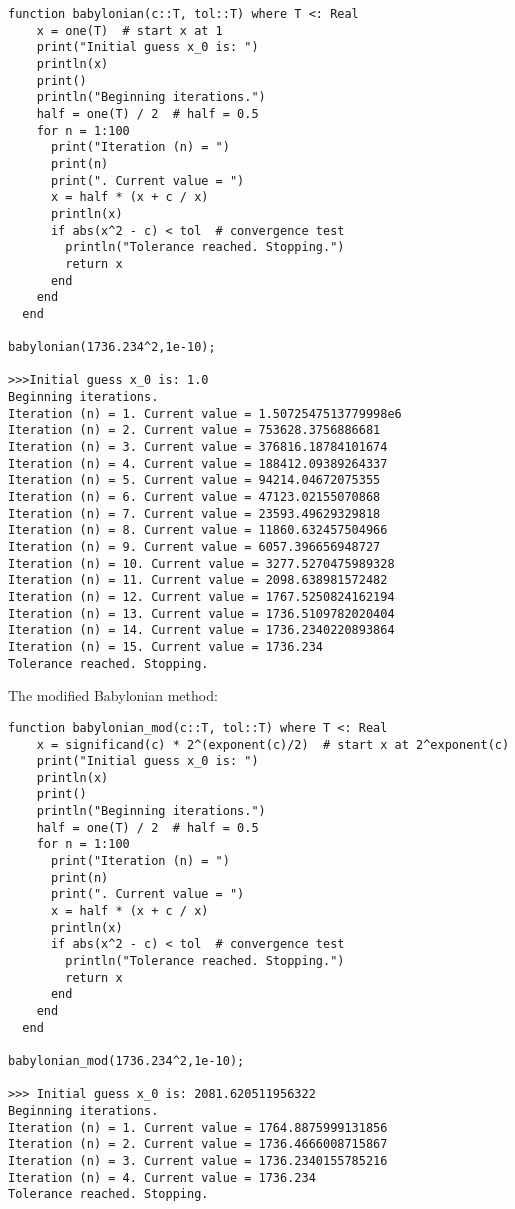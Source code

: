 \documentclass{article}
\begin{document}
\begin{verbatim}
function babylonian(c::T, tol::T) where T <: Real
    x = one(T)  # start x at 1
    print("Initial guess x_0 is: ")
    println(x)
    print()
    println("Beginning iterations.")
    half = one(T) / 2  # half = 0.5
    for n = 1:100
      print("Iteration (n) = ")
      print(n)
      print(". Current value = ")
      x = half * (x + c / x)
      println(x)
      if abs(x^2 - c) < tol  # convergence test
        println("Tolerance reached. Stopping.")
        return x
      end
    end
  end

babylonian(1736.234^2,1e-10);

>>>Initial guess x_0 is: 1.0
Beginning iterations.
Iteration (n) = 1. Current value = 1.5072547513779998e6
Iteration (n) = 2. Current value = 753628.3756886681
Iteration (n) = 3. Current value = 376816.18784101674
Iteration (n) = 4. Current value = 188412.09389264337
Iteration (n) = 5. Current value = 94214.04672075355
Iteration (n) = 6. Current value = 47123.02155070868
Iteration (n) = 7. Current value = 23593.49629329818
Iteration (n) = 8. Current value = 11860.632457504966
Iteration (n) = 9. Current value = 6057.396656948727
Iteration (n) = 10. Current value = 3277.5270475989328
Iteration (n) = 11. Current value = 2098.638981572482
Iteration (n) = 12. Current value = 1767.5250824162194
Iteration (n) = 13. Current value = 1736.5109782020404
Iteration (n) = 14. Current value = 1736.2340220893864
Iteration (n) = 15. Current value = 1736.234
Tolerance reached. Stopping.
\end{verbatim}

The modified Babylonian method: 
\begin{verbatim}
function babylonian_mod(c::T, tol::T) where T <: Real
    x = significand(c) * 2^(exponent(c)/2)  # start x at 2^exponent(c)
    print("Initial guess x_0 is: ")
    println(x)
    print()
    println("Beginning iterations.")
    half = one(T) / 2  # half = 0.5
    for n = 1:100
      print("Iteration (n) = ")
      print(n)
      print(". Current value = ")
      x = half * (x + c / x)
      println(x)
      if abs(x^2 - c) < tol  # convergence test
        println("Tolerance reached. Stopping.")
        return x
      end
    end
  end

babylonian_mod(1736.234^2,1e-10);

>>> Initial guess x_0 is: 2081.620511956322
Beginning iterations.
Iteration (n) = 1. Current value = 1764.8875999131856
Iteration (n) = 2. Current value = 1736.4666008715867
Iteration (n) = 3. Current value = 1736.2340155785216
Iteration (n) = 4. Current value = 1736.234
Tolerance reached. Stopping.
\end{verbatim}
\end{document}
